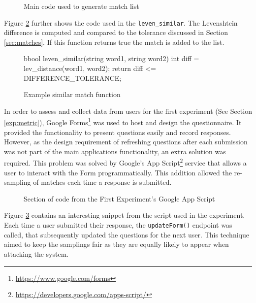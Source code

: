 \begin{figure}[h!]
  \centering
  
  \caption{Main code used to generate match list}
  \label{fig:trustwordMatch}
\end{figure}

Figure \ref{fig:matchExample} further shows the code used in the \verb|leven_similar|. The Levenshtein difference is computed and compared to the tolerance discussed in Section \ref{sec:matches}. If this function returns true the match is added to the list.

\begin{figure}[h!]
\begin{Code}[CppStyle]
bbool leven_similar(string word1, string word2)
{
  int diff = lev_distance(word1, word2);
  return diff <= DIFFERENCE_TOLERANCE;
}
\end{Code}
\caption{Example similar match function}
\label{fig:matchExample}
\end{figure}

\newpage

In order to assess and collect data from users for the first experiment (See Section \ref{exp:metric}), Google Forms\footnote{\url{https://www.google.com/forms}} was used to host and design the questionnaire. It provided the functionality to present questions easily and record responses. However, as the design requirement of refreshing questions after each submission was not part of the main applications functionality, an extra solution was required. This problem was solved by Google's App Script\footnote{\url{https://developers.google.com/apps-script/}} service that allows a user to interact with the Form programmatically. This addition allowed the re-sampling of matches  each time a response is submitted. 

\begin{figure}[!h]
  \centering
  
\caption{Section of code from the First Experiment's Google App Script}
\label{fig:GoogleAppScript}
\end{figure}

Figure \ref{fig:GoogleAppScript} contains an interesting snippet from the script used in the experiment. Each time a user submitted their response, the \verb|updateForm()| endpoint was called, that subsequently updated the questions for the next user. This technique aimed to keep the samplings fair as they are equally likely to appear when attacking the system.

\newpage

